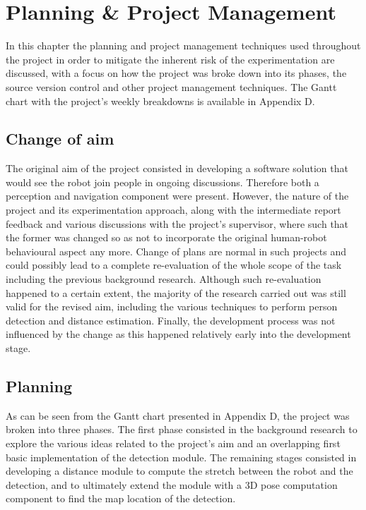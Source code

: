 \chapter{Planning \& Project Management}
\label{chapter7}

In this chapter the planning and project management techniques used throughout the project in order to mitigate the inherent risk of the experimentation are discussed, with a focus on how the project was broke down into its phases, the source version control and other project management techniques. The Gantt chart with the project's weekly breakdowns is available in Appendix D.

\section{Change of aim}

The original aim of the project consisted in developing a software solution that would see the robot join people in ongoing discussions. Therefore both a perception and navigation component were present. However, the nature of the project and its experimentation approach, along with the intermediate report feedback and various discussions with the project's supervisor, where such that the former was changed so as not to incorporate the original human-robot behavioural aspect any more. Change of plans are normal in such projects and could possibly lead to a complete re-evaluation of the whole scope of the task including the previous background research. Although such re-evaluation happened to a certain extent, the majority of the research carried out was still valid for the revised aim, including the various techniques to perform person detection and distance estimation. Finally, the development process was not influenced by the change as this happened relatively early into the development stage.

\section{Planning}

As can be seen from the Gantt chart presented in Appendix D, the project was broken into three phases. The first phase consisted in the background research to explore the various ideas related to the project's aim and an overlapping first basic implementation of the detection module. The remaining stages consisted in developing a distance module to compute the stretch between the robot and the detection, and to ultimately extend the module with a 3D pose computation component to find the map location of the detection.

